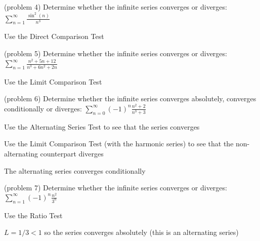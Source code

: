 \documentclass[handout]{ximera}
\begin{document}
\begin{problem}(problem 4)
Determine whether the infinite series converges or diverges: $\displaystyle \sum_{n=1}^\infty \frac{\sin^2(n)}{n^3}$

\begin{hint}
Use the Direct Comparison Test
\end{hint}

\end{problem}

\begin{problem}(problem 5)
Determine whether the infinite series converges or diverges: $\displaystyle \sum_{n=1}^\infty \frac{n^2 + 5n + 12}{n^3 + 6n^2 + 2n}$
\begin{hint}
Use the Limit Comparison Test
\end{hint}

\end{problem}

\begin{problem}(problem 6)
Determine whether the infinite series converges absolutely, converges conditionally or diverges: $\displaystyle \sum_{n=0}^\infty (-1)^n \frac{n^2 + 2}{n^3 + 3}$

\begin{hint}
Use the Alternating Series Test to see that the series converges
\end{hint}

\begin{hint}
Use the Limit Comparison Test (with the harmonic series) to see that the 
non-alternating counterpart diverges
\end{hint}

\begin{hint}
The alternating series converges conditionally
\end{hint}

\end{problem}

\begin{problem}(problem 7)
Determine whether the infinite series converges or diverges: $\displaystyle \sum_{n=1}^\infty (-1)^n\frac{n^2}{3^n}$

\begin{hint}
Use the Ratio Test
\end{hint}

\begin{hint}
$L = 1/3 < 1$ so the series converges absolutely (this is an alternating series)
\end{hint}

\end{problem}
\end{document}
